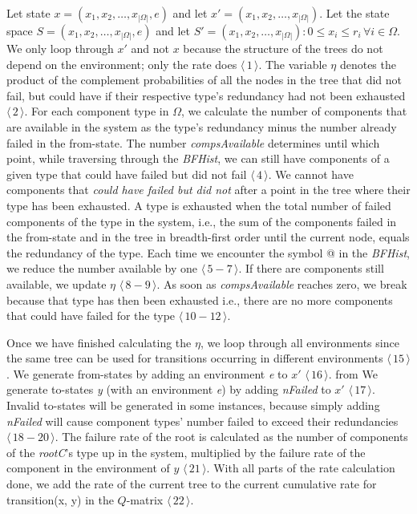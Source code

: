 \documentclass[12pt]{article}
\newcommand{\varName}[1]{\textrm{\it#1}}
\newcommand{\citeLine}[1]{$\langle\,#1\,\rangle$}
\newcommand{\citeBlock}[2]{$\langle\,#1 - #2\,\rangle$}
\begin{document}
Let state $x = (x_{1}, x_{2}, \ldots, x_{|\Omega|}, e)$ and let $x' = (x_{1}, x_{2}, \ldots, x_{|\Omega|})$. Let the state space $S = (x_{1}, x_{2}, \ldots, x_{|\Omega|}, e)$ and let $S' = (x_{1}, x_{2}, \ldots, x_{|\Omega|}): 0 \leq x_{i} \leq r_{i} \, \forall i \in \Omega$. We only loop through $x'$ and not $x$ because the structure of the trees do not depend on the environment; only the rate does \citeLine{1}. The variable $\eta$ denotes the product of the complement probabilities of all the nodes in the tree that did not fail, but could have if their respective type's redundancy had not been exhausted \citeLine{2}. For each component type in $\Omega$, we calculate the number of components that are available in the system as the type's redundancy minus the number already failed in the from-state. The number \varName{compsAvailable} determines until which point, while traversing through the \varName{BFHist}, we can still have components of a given type that could have failed but did not fail \citeLine{4}. We cannot have components that \varName{could have failed but did not} after a point in the tree where their type has been exhausted. A type is exhausted when the total number of failed components of the type in the system, i.e., the sum of the components failed in the from-state and in the tree in breadth-first order until the current node, equals the redundancy of the type. Each time we encounter the symbol @ in the \varName{BFHist}, we reduce the number available by one \citeBlock{5}{7}. If there are components still available, we update $\eta$ \citeBlock{8}{9}. As soon as \varName{compsAvailable} reaches zero, we break because that type has then been exhausted i.e., there are no more components that could have failed for the type \citeBlock{10}{12}.

Once we have finished calculating the $\eta$, we loop through all environments since the same tree can be used for transitions occurring in different environments \citeLine{15}. We generate from-states by adding an environment \varName{e} to $x'$ \citeLine{16}. from We generate to-states \varName{y} (with an environment \varName{e}) by adding \varName{nFailed} to $x'$ \citeLine{17}. Invalid to-states will be generated in some instances, because simply adding \varName{nFailed} will cause component types' number failed to exceed their redundancies \citeBlock{18}{20}. The failure rate of the root is calculated as the number of components of the \varName{rootC}'s type up in the system, multiplied by the failure rate of the component in the environment of $y$ \citeLine{21}. With all parts of the rate calculation done, we add the rate of the current tree to the current cumulative rate for transition(x, y) in the $Q$-matrix \citeLine{22}.
\end{document}

